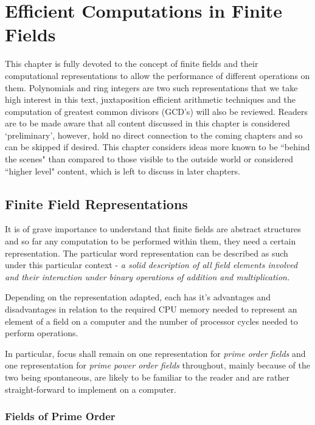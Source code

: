 \documentclass[iwp,first]{luthesis}
\begin{document}
\chapter{Efficient Computations in Finite Fields}

This chapter is fully devoted to the concept of finite fields and their computational representations to allow the performance of different operations on them. Polynomials and ring integers are two such representations that we take high interest in this text, juxtaposition efficient arithmetic techniques and the computation of greatest common divisors (GCD's) will also be reviewed. Readers are to be made aware that all content discussed in this chapter is considered `preliminary', however, hold no direct connection to the coming chapters and so can be skipped if desired. This chapter considers ideas more known to be ``behind the scenes" than compared to those visible to the outside world or considered ``higher level" content, which is left to discuss in later chapters.

\section{Finite Field Representations}

It is of grave importance to understand that finite fields are abstract structures and so far any computation to be performed within them, they need a certain representation. The particular word representation can be described as such under this particular context - \textit{a solid description of all field elements involved and their interaction under binary operations of addition and multiplication.} 

Depending on the representation adapted, each has it's advantages and disadvantages in relation to the required CPU memory needed to represent an element of a field on a computer and the number of processor cycles needed to perform operations. 

In particular, focus shall remain on one representation for \textit{prime order fields} and one representation for \textit{prime power order fields} throughout, mainly because of the two being spontaneous, are likely to be familiar to the reader and are rather straight-forward to implement on a computer.

\subsection{Fields of Prime Order}
\end{document}
